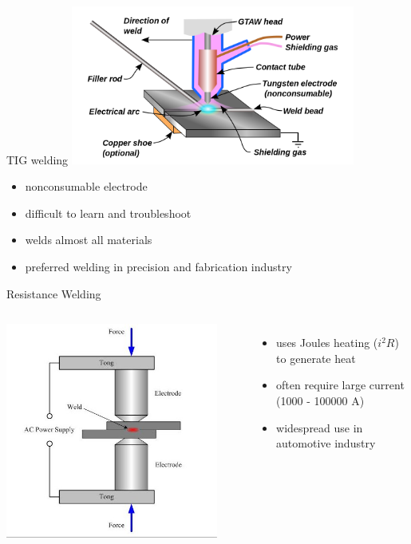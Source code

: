 \documentclass[10pt, svgnames]{beamer}
\begin{document}
\begin{frame}[label={sec:org8314e18}]{TIG welding}
\centering
\includegraphics[width=0.7\textwidth]{pictures/gas-tungsten-arc-welding}
\begin{itemize}
\item nonconsumable electrode
\item difficult to learn and troubleshoot
\item welds almost all materials
\item preferred welding in precision and fabrication industry
\end{itemize}
\end{frame}

\begin{frame}[label={sec:org8c442ab}]{Resistance Welding}
\begin{columns}
  \centering
  \includegraphics[width=0.9\textwidth]{pictures/resistance-spot-welding}
  \begin{itemize}
  \item uses Joules heating ($i^2R$) to generate heat
  \item often require large current (1000 - 100000 A)
  \item widespread use in automotive industry
  \end{itemize}
\end{columns}
\end{frame}
\end{document}
